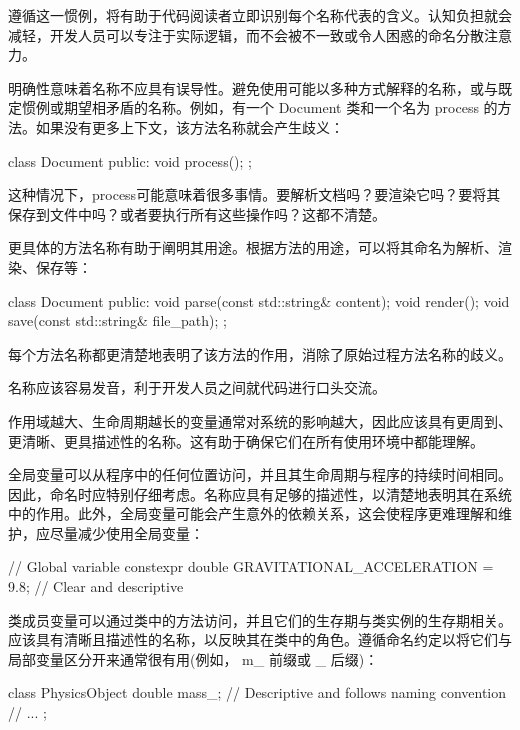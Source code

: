 遵循这一惯例，将有助于代码阅读者立即识别每个名称代表的含义。认知负担就会减轻，开发人员可以专注于实际逻辑，而不会被不一致或令人困惑的命名分散注意力。


明确性意味着名称不应具有误导性。避免使用可能以多种方式解释的名称，或与既定惯例或期望相矛盾的名称。例如，有一个 Document 类和一个名为 process 的方法。如果没有更多上下文，该方法名称就会产生歧义：

\begin{cpp}
class Document {
public:
    void process();
};
\end{cpp}

这种情况下，process可能意味着很多事情。要解析文档吗？要渲染它吗？要将其保存到文件中吗？或者要执行所有这些操作吗？这都不清楚。

更具体的方法名称有助于阐明其用途。根据方法的用途，可以将其命名为解析、渲染、保存等：

\begin{cpp}
class Document {
public:
    void parse(const std::string& content);
    void render();
    void save(const std::string& file_path);
};
\end{cpp}

每个方法名称都更清楚地表明了该方法的作用，消除了原始过程方法名称的歧义。


名称应该容易发音，利于开发人员之间就代码进行口头交流。


作用域越大、生命周期越长的变量通常对系统的影响越大，因此应该具有更周到、 更清晰、更具描述性的名称。这有助于确保它们在所有使用环境中都能理解。

全局变量可以从程序中的任何位置访问，并且其生命周期与程序的持续时间相同。因此，命名时应特别仔细考虑。名称应具有足够的描述性，以清楚地表明其在系统中的作用。此外，全局变量可能会产生意外的依赖关系，这会使程序更难理解和维护，应尽量减少使用全局变量：

\begin{cpp}
// Global variable
constexpr double GRAVITATIONAL_ACCELERATION = 9.8; // Clear and descriptive
\end{cpp}

类成员变量可以通过类中的方法访问，并且它们的生存期与类实例的生存期相关。应该具有清晰且描述性的名称，以反映其在类中的角色。遵循命名约定以将它们与局部变量区分开来通常很有用(例如， m\_ 前缀或 \_ 后缀)：

\begin{cpp}
class PhysicsObject {
    double mass_; // Descriptive and follows naming convention
    // ...
};
\end{cpp}

